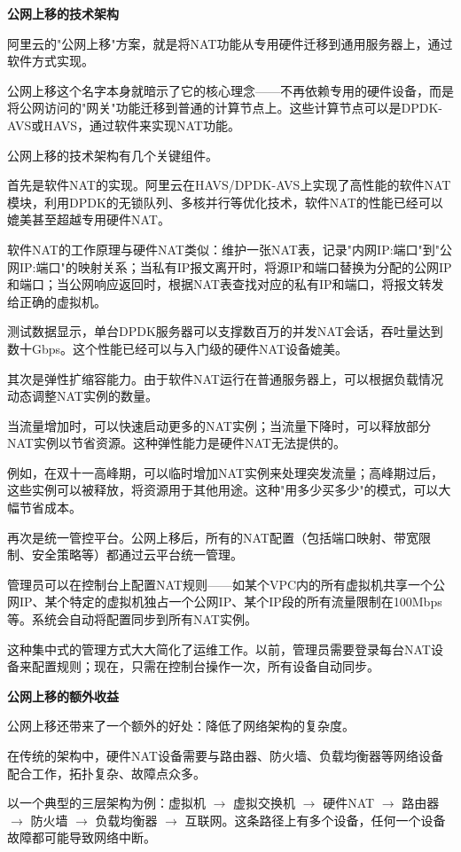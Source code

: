 \textbf{公网上移的技术架构}

阿里云的"公网上移"方案，就是将NAT功能从专用硬件迁移到通用服务器上，通过软件方式实现。

公网上移这个名字本身就暗示了它的核心理念——不再依赖专用的硬件设备，而是将公网访问的"网关"功能迁移到普通的计算节点上。这些计算节点可以是DPDK-AVS或HAVS，通过软件来实现NAT功能。

公网上移的技术架构有几个关键组件。

首先是软件NAT的实现。阿里云在HAVS/DPDK-AVS上实现了高性能的软件NAT模块，利用DPDK的无锁队列、多核并行等优化技术，软件NAT的性能已经可以媲美甚至超越专用硬件NAT。

软件NAT的工作原理与硬件NAT类似：维护一张NAT表，记录"内网IP:端口"到"公网IP:端口"的映射关系；当私有IP报文离开时，将源IP和端口替换为分配的公网IP和端口；当公网响应返回时，根据NAT表查找对应的私有IP和端口，将报文转发给正确的虚拟机。

测试数据显示，单台DPDK服务器可以支撑数百万的并发NAT会话，吞吐量达到数十Gbps。这个性能已经可以与入门级的硬件NAT设备媲美。

其次是弹性扩缩容能力。由于软件NAT运行在普通服务器上，可以根据负载情况动态调整NAT实例的数量。

当流量增加时，可以快速启动更多的NAT实例；当流量下降时，可以释放部分NAT实例以节省资源。这种弹性能力是硬件NAT无法提供的。

例如，在双十一高峰期，可以临时增加NAT实例来处理突发流量；高峰期过后，这些实例可以被释放，将资源用于其他用途。这种"用多少买多少"的模式，可以大幅节省成本。

再次是统一管控平台。公网上移后，所有的NAT配置（包括端口映射、带宽限制、安全策略等）都通过云平台统一管理。

管理员可以在控制台上配置NAT规则——如某个VPC内的所有虚拟机共享一个公网IP、某个特定的虚拟机独占一个公网IP、某个IP段的所有流量限制在100Mbps等。系统会自动将配置同步到所有NAT实例。

这种集中式的管理方式大大简化了运维工作。以前，管理员需要登录每台NAT设备来配置规则；现在，只需在控制台操作一次，所有设备自动同步。

\textbf{公网上移的额外收益}

公网上移还带来了一个额外的好处：降低了网络架构的复杂度。

在传统的架构中，硬件NAT设备需要与路由器、防火墙、负载均衡器等网络设备配合工作，拓扑复杂、故障点众多。

以一个典型的三层架构为例：虚拟机 $\rightarrow$ 虚拟交换机 $\rightarrow$ 硬件NAT $\rightarrow$ 路由器 $\rightarrow$ 防火墙 $\rightarrow$ 负载均衡器 $\rightarrow$ 互联网。这条路径上有多个设备，任何一个设备故障都可能导致网络中断。

